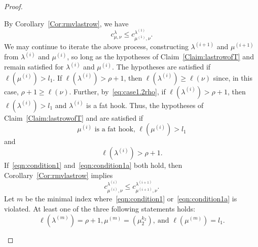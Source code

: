 \begin{proof}
\begin{Case}
By Corollary~\ref{Cor:rmvlastrow}, we have
\begin{equation}
\label{eq:firstiterationbound}
c^{\lambda}_{\mu,\nu} \leq c^{\lambda^{(1)}}_{\mu^{(1)},\nu}.
\end{equation}
We may continue to iterate the above process, constructing $\lambda^{(i+1)}$ and $\mu^{(i+1)}$ from $\lambda^{(i)}$ and $\mu^{(i)}$, so long as the hypotheses of Claim~\ref{Claim:lastrowofT} and %
 remain satisfied for $\lambda^{(i)}$ and $\mu^{(i)}$. The  hypotheses are satisfied if $\ell(\mu^{(i)}) > l_1$. If $\ell(\lambda^{(i)}) > \rho + 1$, then $\ell(\lambda^{(i)}) \geq \ell(\nu)$ since, in this case, $\rho + 1 \geq \ell(\nu)$. Further, by~\eqref{eq:case1.2rho}, if $\ell(\lambda^{(i)}) > \rho + 1$, then $\ell(\lambda^{(i)}) > l_1$ and $\lambda^{(i)}$ is a fat hook. Thus, the hypotheses of Claim~\ref{Claim:lastrowofT} and  are satisfied if 
\begin{equation}\label{eqn:condition1}
 \mu^{(i)}\text{ is a fat hook, }\ell(\mu^{(i)}) > l_1
\end{equation}
and 
\begin{equation}\label{eqn:condition1a}
 \ell(\lambda^{(i)}) > \rho+1 .
\end{equation}
If~\eqref{eqn:condition1} and~\eqref{eqn:condition1a} both hold, then Corollary~\ref{Cor:rmvlastrow} implies
\begin{equation}\label{eqn:increase}
 c^{\lambda^{(i)}}_{\mu^{(i)},\nu} \leq c^{\lambda^{(i+1)}}_{\mu^{(i+1)},\nu}.
\end{equation}
Let $m$ be the minimal index where~\eqref{eqn:condition1} or~\eqref{eqn:condition1a} is violated. At least one of the three following statements holds: 
\[
\ell(\lambda^{(m)}) = \rho+1, \mu^{(m)} = (\mu_2^{k_2}),\ \text{and } \ell(\mu^{(m)}) = l_1.
\]


\end{Case}
\end{proof}
